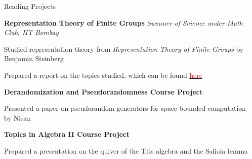
\begin{rubric}{Reading Projects}

	\entry*[2022] \textbf{Representation Theory of Finite Groups} \hfill \emph{Summer of Science under Math Club, IIT Bombay}

		Studied representation theory from \emph{Representation Theory of Finite Groups} by Benjamin Steinberg

		Prepared a report on the topics studied, which can be found \href{https://amitrajaraman.github.io/notes/rep-th/main.pdf}{\textcolor{red}{here}}

	\entry*[2022\phantom{}] \textbf{Derandomization and Pseudorandomness Course Project}

		Presented a paper on pseudorandom generators for space-bounded computation by Nisan%

	\entry*[2020\phantom{}] \textbf{Topics in Algebra II Course Project}

		Prepared a presentation on the quiver of the Tits algebra and the Saliola lemma


		






        
\end{rubric}